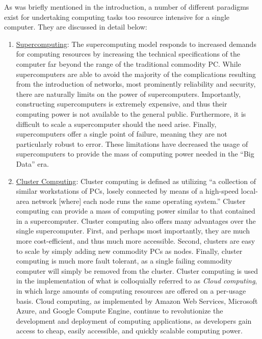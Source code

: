 As was briefly mentioned in the introduction, a number of different paradigms
exist for undertaking computing tasks too resource intensive for a single
computer. They are discussed in detail below:

\begin{enumerate}
  \item \underline{Supercomputing}: The supercomputing model responds to
    increased demands for computing resources by increasing the technical
    specifications of the computer far beyond the range of the
    traditional commodity PC.
    While supercomputers are able to avoid the majority of the complications
    resulting from the introduction of networks, most prominently reliability and
    security, there are naturally limits on the power of supercomputers.
    Importantly, constructing supercomputers is extremely expensive, and thus
    their computing power is not available to the general public. Furthermore,
    it is difficult to scale a supercomputer should the need arise. Finally,
    supercomputers offer a single point of failure, meaning they are not
    particularly robust to error. These limitations have decreased the usage of
    supercomputers to provide the mass of computing power needed in the ``Big
    Data'' era.

  \item \underline{Cluster Computing}: Cluster computing is defined as utilizing
    ``a collection of similar workstations of PCs, losely connected by means of
    a high-speed local-area network [where] each node runs the same operating
    system.''\cite[pg. 17-18]{distributed-systems-principles-and-paradigms}
    Cluster computing can provide a mass of computing power similar to
    that contained in a supercomputer. Cluster computing also offers many
    advantages over the single supercomputer. First, and perhaps most
    importantly, they are much more cost-efficient, and thus much more
    accessible. Second, clusters are easy to
    scale by simply adding new commodity PCs as nodes.
    Finally, cluster computing is much more fault
    tolerant, as a single failing commodity computer will simply be removed
    from the cluster. Cluster computing is used in the
    implementation of what is colloquially referred to as \textit{Cloud
    computing}, in which large amounts of computing resources are offered on a
    per-usage basis.\cite[pg. 13]{distributed-systems-concepts-and-design}
    Cloud computing, as implemented by Amazon Web
    Services,\cite{amazon-web-services} Microsoft Azure,\cite{microsoft-azure}
    and Google Compute Engine,\cite{google-compute-engine} continue to
    revolutionize the development and deployment of computing applications, as
    developers gain access to cheap, easily accessible, and quickly scalable
    computing power.


\end{enumerate}
